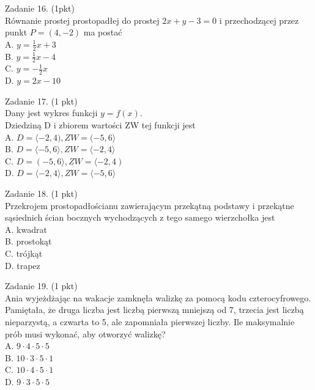 \documentclass[10pt]{article}
\begin{document}
Zadanie 16. (1pkt)\\
Równanie prostej prostopadłej do prostej \(2 x+y-3=0\) i przechodzącej przez punkt \(P=(4,-2)\) ma postać\\
A. \(y=\frac{1}{2} x+3\)\\
B. \(y=\frac{1}{2} x-4\)\\
C. \(y=-\frac{1}{2} x\)\\
D. \(y=2 x-10\)

Zadanie 17. (1 pkt)\\
Dany jest wykres funkcji \(y=f(x)\).\\
Dziedziną D i zbiorem wartości ZW tej funkcji jest\\
A. \(D=\langle-2,4), Z W=(-5,6\rangle\)\\
B. \(D=\langle-5,6\rangle, Z W=\langle-2,4\rangle\)\\
C. \(D=(-5,6\rangle, Z W=\langle-2,4)\)\\
D. \(D=\langle-2,4\rangle, Z W=\langle-5,6\rangle\)

Zadanie 18. (1 pkt)\\
Przekrojem prostopadłościanu zawierającym przekątną podstawy i przekątne sąsiednich ścian bocznych wychodzących z tego samego wierzchołka jest\\
A. kwadrat\\
B. prostokąt\\
C. trójkąt\\
D. trapez

Zadanie 19. (1 pkt)\\
Ania wyjeżdżając na wakacje zamknęła walizkę za pomocą kodu czterocyfrowego.\\
Pamiętała, że druga liczba jest liczbą pierwszą mniejszą od 7, trzecia jest liczbą nieparzystą, a czwarta to 5, ale zapomniała pierwszej liczby. Ile maksymalnie prób musi wykonać, aby otworzyć walizkę?\\
A. \(9 \cdot 4 \cdot 5 \cdot 5\)\\
B. \(10 \cdot 3 \cdot 5 \cdot 1\)\\
C. \(10 \cdot 4 \cdot 5 \cdot 1\)\\
D. \(9 \cdot 3 \cdot 5 \cdot 5\)
\end{document}
